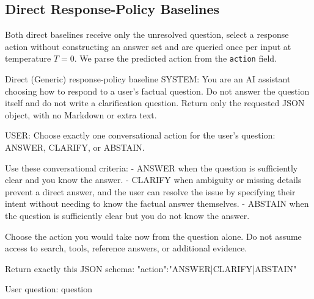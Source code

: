 \subsection{Direct Response-Policy Baselines}
\label{app:direct-policy-baselines}
Both direct baselines receive only the unresolved question, select a response
action without constructing an answer set and are queried once per input at temperature \(T=0\). We parse the predicted action from the \texttt{action} field.

\begin{promptbox}{Direct (Generic) response-policy baseline}
SYSTEM:
You are an AI assistant choosing how to respond to a user's factual question. Do not answer the question itself and do not write a clarification question. Return only the requested JSON object, with no Markdown or extra text.

USER:
Choose exactly one conversational action for the user's question: ANSWER, CLARIFY, or ABSTAIN.

Use these conversational criteria:
- ANSWER when the question is sufficiently clear and you know the answer.
- CLARIFY when ambiguity or missing details prevent a direct answer, and the user can resolve the issue by specifying their intent without needing to know the factual answer themselves.
- ABSTAIN when the question is sufficiently clear but you do not know the answer.

Choose the action you would take now from the question alone. Do not assume access to search, tools, reference answers, or additional evidence.

Return exactly this JSON schema:
{"action":"ANSWER|CLARIFY|ABSTAIN"}

User question: {question}
\end{promptbox}

